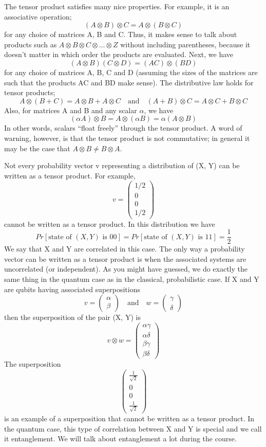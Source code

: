 \documentclass[12pt, oneside]{book}
\theoremstyle{definition}
\theoremstyle{definition}
\theoremstyle{remark}
\begin{document}
The tensor product satisfies many nice properties. For example, it is an associative operation;
$$(A \otimes B) \otimes  C = A \otimes (B \otimes C)$$ for any choice of matrices A, B and C. Thus, it makes sense to talk about products such as $A \otimes B \otimes C \otimes \ldots \otimes Z$ without including parentheses, because it doesn’t matter in which order the products are evaluated. Next, we have
\[
(A\otimes B)(C\otimes D)=(AC)\otimes (BD)
\]
for any choice of matrices A, B, C and D (assuming the sizes of the matrices are such that the
products AC and BD make sense). The distributive law holds for tensor products;
\[
A\otimes (B+C)=A\otimes B+A\otimes C \quad \text{and} \quad (A+B)\otimes C=A\otimes C+B\otimes C
\]
Also, for matrices A and B and any scalar $\alpha$, we have
\[
(\alpha A)\otimes B=A \otimes (\alpha B)=\alpha(A\otimes B)
\]
In other words, scalars “float freely” through the tensor product. A word of warning, however, is
that the tensor product is not commutative; in general it may be the case that $A\otimes B\neq B\otimes A$.

Not every probability vector v representing a distribution of (X, Y) can be written as a tensor
product. For example,
\[
v=\begin{pmatrix}1/2\\0\\0 \\ 1/2 \end{pmatrix}
\]
cannot be written as a tensor product. In this distribution we have
\[
Pr[\text{state of $(X,Y)$ is $00$}]=Pr[\text{state of $(X,Y)$ is }11]=\frac{1}{2}
\]
We say that X and Y are correlated in this case. The only way a probability vector can be written
as a tensor product is when the associated systems are uncorrelated (or independent).
As you might have guessed, we do exactly the same thing in the quantum case as in the classical, probabilistic case. If X and Y are qubits having associated superpositions
\[
v=\begin{pmatrix} \alpha \\ \beta \end{pmatrix} \quad \text{and} \quad w=\begin{pmatrix} \gamma \\ \delta \end{pmatrix}
\]
then the superposition of the pair (X, Y) is
\[
v\otimes w=\begin{pmatrix} \alpha\gamma \\ \alpha\delta \\ \beta\gamma\\\beta\delta \end{pmatrix}
\]
The superposition
\[
\begin{pmatrix} \frac{1}{\sqrt{2}} \\ 0 \\ 0 \\ \frac{1}{\sqrt{2}} \end{pmatrix}
\]
is an example of a superposition that cannot be written as a tensor product. In the quantum case,
this type of correlation between X and Y is special and we call it entanglement. We will talk about
entanglement a lot during the course.
\end{document}
